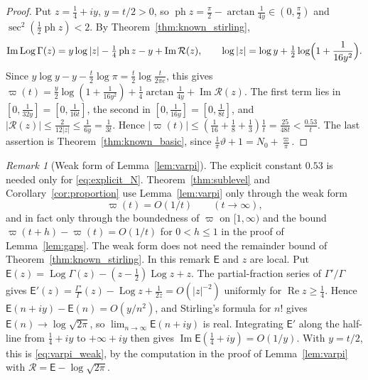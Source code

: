 \documentclass[11pt,a4paper]{article}
\makeatletter
\numberwithin{equation}{section}
\DeclareRobustCommand{\CGref}[1]{\ref{#1}}
\DeclareRobustCommand{\CGeqref}[1]{\eqref{#1}}
\let\CG@origref\ref
\let\CG@origeqref\eqref
\newcommand{\CG@gettip}[1]{\@ifundefined{CGTip@#1}{#1}{\csname CGTip@#1\endcsname}}
\DeclareRobustCommand{\CGref}[1]{\pdftooltip{\CG@origref{#1}}{\CG@gettip{#1}}}
\DeclareRobustCommand{\CGeqref}[1]{\pdftooltip{\CG@origeqref{#1}}{\CG@gettip{#1}}}
\theoremstyle{definition}
\theoremstyle{remark}
\newtheorem{remark}[theorem]{Remark}
\newcommand{\Nz}{N_0} %
\makeatother
\begin{document}
\begin{proof}
Put $z=\frac14+iy$, $y=t/2>0$, so $\operatorname{ph}z=\frac\pi2-\arctan\frac1{4y}\in(0,\frac\pi2)$ and $\sec^2(\frac12\operatorname{ph}z)<2$. By Theorem~\CGref{thm:known_stirling},
\[
\operatorname{Im}\operatorname{Log}\Gamma(z)=y\log|z|-\tfrac14\operatorname{ph}z-y+\operatorname{Im}\mathcal R(z),\qquad \log|z|=\log y+\tfrac12\log\Bigl(1+\frac1{16y^2}\Bigr).
\]
Since $y\log y-y-\frac t2\log\pi=\frac t2\log\frac t{2\pi e}$, this gives $\varpi(t)=\frac y2\log(1+\frac1{16y^2})+\frac14\arctan\frac1{4y}+\operatorname{Im}\mathcal R(z)$. The first term lies in $[0,\frac1{32y}]=[0,\frac1{16t}]$, the second in $[0,\frac1{16y}]=[0,\frac1{8t}]$, and $|\mathcal R(z)|\le\frac2{12|z|}\le\frac1{6y}=\frac1{3t}$. Hence $|\varpi(t)|\le(\frac1{16}+\frac18+\frac13)\frac1t=\frac{25}{48t}<\frac{0.53}t$. The last assertion is Theorem~\CGref{thm:known_basic}, since $\frac1\pi\vartheta+1=\Nz+\frac\varpi\pi$.
\end{proof}

\begin{remark}[Weak form of Lemma~\ref{lem:varpi}]\label{rem:varpi_weak}
The explicit constant $0.53$ is needed only for \CGeqref{eq:explicit_N}. Theorem~\CGref{thm:sublevel} and Corollary~\CGref{cor:proportion} use Lemma~\CGref{lem:varpi} only through the weak form
\begin{equation}
\varpi(t)=O(1/t)\qquad(t\to\infty),
\label{eq:varpi_weak}
\end{equation}
and in fact only through the boundedness of $\varpi$ on $[1,\infty)$ and the bound $\varpi(t+h)-\varpi(t)=O(1/t)$ for $0<h\le1$ in the proof of Lemma~\CGref{lem:gaps}. The weak form does not need the remainder bound of Theorem~\CGref{thm:known_stirling}. In this remark $\mathsf E$ and $z$ are local. Put $\mathsf E(z)=\operatorname{Log}\Gamma(z)-(z-\frac12)\operatorname{Log}z+z$. The partial-fraction series of $\Gamma'/\Gamma$ gives $\mathsf E'(z)=\frac{\Gamma'}\Gamma(z)-\operatorname{Log}z+\frac1{2z}=O(|z|^{-2})$ uniformly for $\operatorname{Re}z\ge\frac14$. Hence $\mathsf E(n+iy)-\mathsf E(n)=O(y/n^2)$, and Stirling's formula for $n!$ gives $\mathsf E(n)\to\log\sqrt{2\pi}$, so $\lim_{n\to\infty}\mathsf E(n+iy)$ is real. Integrating $\mathsf E'$ along the half-line from $\frac14+iy$ to $+\infty+iy$ then gives $\operatorname{Im}\mathsf E(\frac14+iy)=O(1/y)$. With $y=t/2$, this is \CGeqref{eq:varpi_weak}, by the computation in the proof of Lemma~\CGref{lem:varpi} with $\mathcal R=\mathsf E-\log\sqrt{2\pi}$.
\end{remark}
\end{document}
